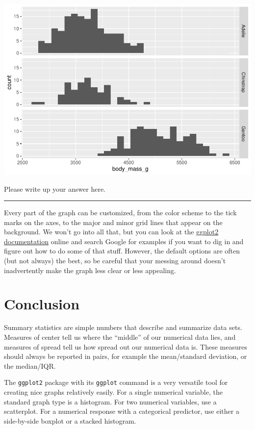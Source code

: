 \documentclass[
]{book}
\begin{document}
\includegraphics{intro_stats_files/figure-latex/unnamed-chunk-116-1.pdf}

Please write up your answer here.

\begin{center}\rule{0.5\linewidth}{0.5pt}\end{center}

Every part of the graph can be customized, from the color scheme to the tick marks on the axes, to the major and minor grid lines that appear on the background. We won't go into all that, but you can look at the \href{http://ggplot2.tidyverse.org/}{ggplot2 documentation} online and search Google for examples if you want to dig in and figure out how to do some of that stuff. However, the default options are often (but not always) the best, so be careful that your messing around doesn't inadvertently make the graph less clear or less appealing.

\hypertarget{numerical-conclusion}{%
\section{Conclusion}\label{numerical-conclusion}}

Summary statistics are simple numbers that describe and summarize data sets. Measures of center tell us where the ``middle'' of our numerical data lies, and measures of spread tell us how spread out our numerical data is. These measures should always be reported in pairs, for example the mean/standard deviation, or the median/IQR.

The \texttt{ggplot2} package with its \texttt{ggplot} command is a very versatile tool for creating nice graphs relatively easily. For a single numerical variable, the standard graph type is a histogram. For two numerical variables, use a scatterplot. For a numerical response with a categorical predictor, use either a side-by-side boxplot or a stacked histogram.
\end{document}
